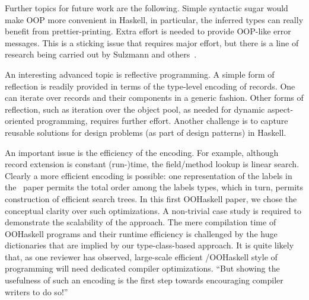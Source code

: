 \begin{comment}
At present, error messages belie the
complexity, and this is the topic of future research (and so it is for
C++, where error messages in template meta-programs may span several
hundred lines and be humanly incomprehensible).
\end{comment}

Further topics for future work are the following. Simple syntactic
sugar would make OOP more convenient in Haskell, in particular, the
inferred types can really benefit from prettier-printing.  Extra
effort is needed to provide OOP-like error messages.  This is a
sticking issue that requires major effort, but there is a line of
research being carried out by Sulzmann and others~\cite{SSW04}.

An interesting advanced topic is reflective programming. A simple form
of reflection is readily provided in terms of the type-level encoding
of records. One can iterate over records and their components in a
generic fashion. Other forms of reflection, such as iteration over the
object pool, as needed for dynamic aspect-oriented programming,
requires further effort. Another challenge is to capture reusable
solutions for design problems (as part of design patterns) in Haskell.

An important issue is the efficiency of the encoding.  For example,
although record extension is constant (run-)time, the field/method
lookup is linear search. Clearly a more efficient encoding is
possible: one representation of the labels in the \HList\ paper
permits the total order among the labels types, which in turn, permits
construction of efficient search trees. In this first OOHaskell paper,
we chose the conceptual clarity over such optimizations.  A
non-trivial case study is required to demonstrate the scalability of
the approach. The mere compilation time of OOHaskell programs and
their runtime efficiency is challenged by the huge dictionaries that
are implied by our type-class-based approach. It is quite likely that,
as one reviewer has observed, large-scale efficient
\HList/OOHaskell style of programming will need dedicated compiler
optimizations. ``But showing the usefulness of such an encoding is the
first step towards encouraging compiler writers to do so!''
